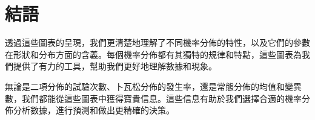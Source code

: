 \section{結語}
透過這些圖表的呈現，我們更清楚地理解了不同機率分佈的特性，以及它們的參數在形狀和分布方面的含義。每個機率分佈都有其獨特的規律和特點，這些圖表為我們提供了有力的工具，幫助我們更好地理解數據和現象。

無論是二項分佈的試驗次數、卜瓦松分佈的發生率，還是常態分佈的均值和變異數，我們都能從這些圖表中獲得寶貴信息。這些信息有助於我們選擇合適的機率分佈分析數據，進行預測和做出更精確的決策。





















